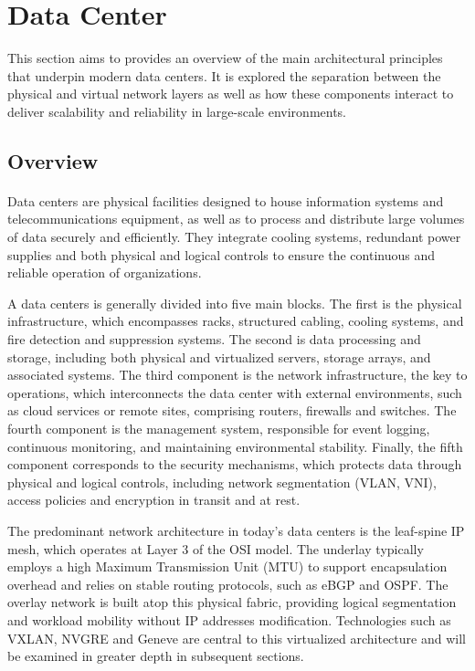 \section{Data Center}

This section aims to provides an overview of the main architectural principles that underpin modern data centers. It is explored the separation between the physical and virtual network layers as well as how these components interact to deliver scalability and reliability in large-scale environments.

\subsection{Overview}
\paragraph{}
Data centers are physical facilities designed to house information systems and telecommunications equipment, as well as to process and distribute large volumes of data securely and efficiently. They integrate cooling systems, redundant power supplies and both physical and logical controls to ensure the continuous and reliable operation of organizations.\par

A data centers is generally divided into five main blocks. The first is the physical infrastructure, which encompasses racks, structured cabling, cooling systems, and fire detection and suppression systems. The second is data processing and storage, including both physical and virtualized servers, storage arrays, and associated systems. The third component is the network infrastructure, the key to operations, which interconnects the data center with external environments, such as cloud services or remote sites, comprising routers, firewalls and switches. The fourth component is the management system, responsible for event logging, continuous monitoring, and maintaining environmental stability. Finally, the fifth component corresponds to the security mechanisms, which protects data through physical and logical controls, including network segmentation (VLAN, VNI), access policies and encryption in transit and at rest. \par

The predominant network architecture in today's data centers is the leaf-spine IP mesh, which operates at Layer 3 of the OSI model. The underlay typically employs a high Maximum Transmission Unit (MTU) to support encapsulation overhead and relies on stable routing protocols, such as eBGP and OSPF. The overlay network is built atop this physical fabric, providing logical segmentation and workload mobility without IP addresses modification. Technologies such as VXLAN, NVGRE and Geneve are central to this virtualized architecture and will be examined in greater depth in subsequent sections.\par

